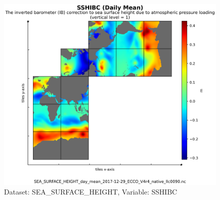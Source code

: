 \begin{figure}[H]
\centering
\includegraphics[scale=0.55]{../images/plots/v4r4/native_plots/Sea_Surface_Height/SSHIBC.png}
\caption{Dataset: SEA\_SURFACE\_HEIGHT, Variable: SSHIBC}
\label{tab:table-SEA_SURFACE_HEIGHT_SSHIBC-Plot}
\end{figure}
\newpage
\pagebreak
